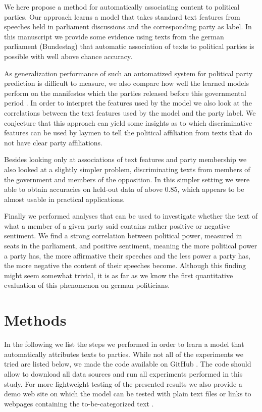 \documentclass{article} %
\begin{document}
We here propose a method for automatically associating content to political parties. Our approach learns a model that takes standard text features from speeches held in parliament discussions and the corresponding party as label. In this manuscript we provide some evidence using texts from the german parliament (Bundestag) \cite{plenarprotokolle} that automatic association of texts to political parties is possible with well above chance accuracy. 

As generalization performance of such an automatized system for political party prediction is difficult to measure, we also compare how well the learned models perform on the manifestos which the parties released before this governmental period \cite{linke_parteiprogramm, gruene_parteiprogramm,spd_parteiprogramm, cdu_parteiprogramm}. In order to interpret the features used by the model we also look at the correlations between the text features used by the model and the party label. We conjecture that this approach can yield some insights as to which discriminative features can be used by laymen to tell the political affiliation from texts that do not have clear party affiliations. 

Besides looking only at associations of text features and party membership we also looked at a slightly simpler problem, discriminating texts from members of the government and members of the opposition. In this simpler setting we were able to obtain accuracies on held-out data of above 0.85, which appears to be almost usable in practical applications. 

Finally we performed analyses that can be used to investigate whether the text of what a member of a given party said contains rather positive or negative sentiment. We find a strong correlation between political power, measured in seats in the parliament, and positive sentiment, meaning the more political power a party has, the more affirmative their speeches and the less power a party has, the more negative the content of their speeches become. Although this finding might seem somewhat trivial, it is as far as we know the first quantitative evaluation of this phenomenon on german politicians. 

\section{Methods}

In the following we list the steps we performed in order to learn a model that automatically attributes texts to parties. While not all of the experiments we tried are listed below, we made the code available on GitHub \cite{linksrechts_code}. The code should allow to download all data sources and run all experiments performed in this study. For more lightweight testing of the presented results we also provide a demo web site on which the model can be tested with plain text files or links to webpages containing the to-be-categorized text \cite{linksrechts}. 
\end{document}
